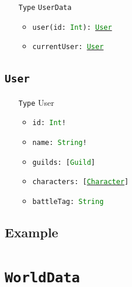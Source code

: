 \documentclass[10pt, a4paper]{memoir}
\numberwithin{equation}{section}
\theoremstyle{plain}
\theoremstyle{defp}
\theoremstyle{dotless}
\theoremstyle{definition}
\theoremstyle{dotless}
\theoremstyle{dotless}
\theoremstyle{defp}
\theoremstyle{defp}
\theoremstyle{be}          %
\theoremstyle{defp}
\newcommand\ttt[1]{\texttt{#1}}
\newcommand\type[1]{\ttt{\textcolor{green}{#1}}}
\begin{document}
\begin{itemize}[noitemsep,topsep=1pt]
\item[\ttt{Type}] \ttt{UserData}
\begin{itemize}[itemsep=1pt,topsep=1pt]
\item \ttt{user(id: \type{Int}): \hyperref[sec:User]{\type{User}}}
\item \ttt{currentUser: \hyperref[sec:User]{\type{User}}}
\end{itemize}
\end{itemize}

\subsection{\ttt{User}}\label{sec:User}

\begin{itemize}[noitemsep,topsep=1pt]
\item[\ttt{Type}] User
\begin{itemize}[itemsep=1pt,topsep=1pt]
\item \ttt{id: \type{Int}!}
\item \ttt{name: \type{String}!}
\item \ttt{guilds: [\type{Guild}]}
\item \ttt{characters: [\hyperref[sec:Character]{\type{Character}}]}
\item \ttt{battleTag: \type{String}}
\end{itemize}
\end{itemize}

\subsection{Example}

\newpage




\section{\ttt{WorldData}}\label{sec:WorldData}
\end{document}
